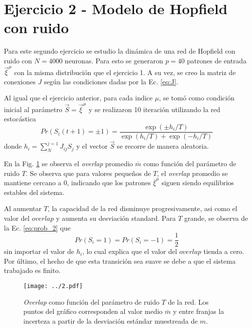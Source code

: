 \section*{Ejercicio 2 - Modelo de Hopfield con ruido}

Para este segundo ejercicio se estudio la dinámica de una red de Hopfield con ruido con $N=4000$ neuronas. Para esto se generaron $p=40$ patrones de entrada $\vec{\xi}^{\mu}$ con la misma distribución que el ejercicio 1. A su vez, se creo la matriz de conexiones $J$ según las condiciones dadas por la Ec. \ref{eq:J}.

Al igual que el ejercicio anterior, para cada indice $\mu$, se tomó como condición inicial al parámetro $\vec{S} = \vec{\xi}^{\mu}$ y se realizaron 10 iteración utilizando la red estocástica
\begin{equation}
    Pr\left( S_{i}\left(t+1\right) = \pm 1 \right) = \frac{\exp \left( \pm h_{i}/T \right) }{\exp \left(  h_{i}/T \right) + \exp \left( - h_{i}/T \right)}
    \label{eq:prob_2}
\end{equation}
donde $h_{i} = \sum_{N}^{j=1} J_{ij}S_{j}$ y el vector $\vec{S}$ se recorre de manera aleatoria.

En la Fig. \ref{fig:02} se observa el \textit{overlap} promedio $\overline{m}$ como función del parámetro de ruido $T$. Se observa que para valores pequeños de $T$, el \textit{overlap} promedio se mantiene cercano a 0, indicando que los patrones $\overline{\xi}^{\mu}$ siguen siendo equilibrios estables del sistema.

Al aumentar $T$, la capacidad de la red disminuye progresivamente, asi como el valor del $overlap$ y aumenta su desviación standard. Para $T$ grande, se observa de la Ec. \ref{eq:prob_2} que
\begin{equation}
    Pr\left(S_i = 1\right) = Pr\left(S_i  = -1\right) = \dfrac{1}{2}
\end{equation}
sin importar el valor de $h_i$, lo cual explica que el valor del $overlap$ tienda a cero. Por último, el hecho de que esta transición sea suave se debe a que el sistema trabajado es finito.

\begin{figure}[t!]
    \centering
    \texttt{[image: ../2.pdf]}
    \caption{\textit{Overlap} como función del parámetro de ruido $T$ de la red. Los puntos del gráfico corresponden al valor medio $\overline{m}$ y entre franjas la incerteza a partir de la desviación estándar muestreada de $m$.}
    \label{fig:02}
\end{figure}

